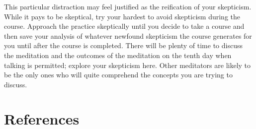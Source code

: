 \documentclass{article}
\begin{document}
This particular distraction may feel justified as the reification of your skepticism. While it pays to be skeptical, try your hardest to avoid skepticism during the course. Approach the practice skeptically until you decide to take a course and then save your analysis of whatever newfound skepticism the course generates for you until after the course is completed. There will be plenty of time to discuss the meditation and the outcomes of the meditation on the tenth day when talking is permitted; explore your skepticism here. Other meditators are likely to be the only ones who will quite comprehend the concepts you are trying to discuss.

\pagebreak

\section*{References}
\end{document}
